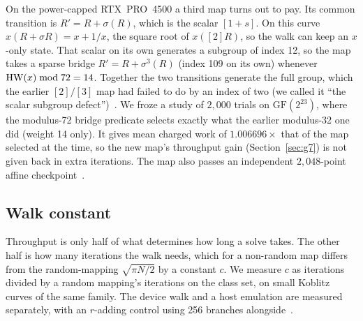 On the power-capped RTX~PRO~4500 a third map turns out to pay. Its
common transition is $R' = R + \sigma(R)$, which is the scalar $[1+s]$.
On this curve $x(R+\sigma R)=x+1/x$, the square root of $x([2]R)$, so
the walk can keep an $x$-only state. That scalar on its own generates
a subgroup of index 12, so the map takes a sparse bridge
$R' = R + \sigma^3(R)$ (index 109 on its own) whenever
$\operatorname{HW}(x) \bmod 72 = 14$. Together the two transitions generate the full
group, which the earlier $[2]/[3]$ map had failed to do by an index of
two (we called it ``the scalar subgroup defect'')~.
We froze a study of $2{,}000$ trials on $\mathrm{GF}(2^{23})$, where the
modulus-72 bridge predicate selects exactly what the earlier modulus-32
one did (weight 14 only). It gives mean charged work of
$1.006696\times$ that of the map selected at the time, so the new map's
throughput gain (Section~\ref{sec:g7}) is not given back in extra
iterations. The map also passes an independent $2{,}048$-point affine
checkpoint~.

\subsection{Walk constant}
\label{sec:walk-constant}

Throughput is only half of what determines how long a solve takes.
The other half is how many iterations the walk needs, which for a
non-random map differs from the random-mapping $\sqrt{\pi N/2}$ by a
constant $c$. We measure $c$ as iterations divided by a random
mapping's iterations on the class set, on small Koblitz curves of the
same family. The device walk and a host emulation are measured
separately, with an $r$-adding control using 256 branches alongside~.

